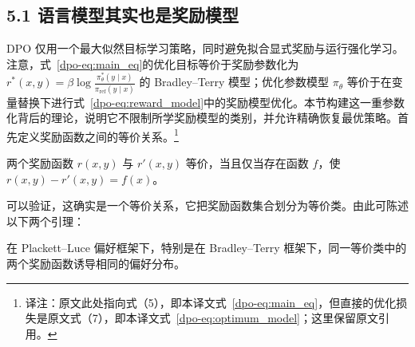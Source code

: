 \label{dpo-sec:theory}

\subsection*{5.1 语言模型其实也是奖励模型}
DPO 仅用一个最大似然目标学习策略，同时避免拟合显式奖励与运行强化学习。注意，式~\ref{dpo-eq:main_eq}的优化目标等价于奖励参数化为 $r^*(x,y)=\beta\log\frac{\pi^*_\theta(y\mid x)}{\pi_{\mathrm{ref}}(y\mid x)}$ 的 Bradley--Terry 模型；优化参数模型 $\pi_\theta$ 等价于在变量替换下进行式~\ref{dpo-eq:reward_model}中的奖励模型优化。本节构建这一重参数化背后的理论，说明它不限制所学奖励模型的类别，并允许精确恢复最优策略。首先定义奖励函数之间的等价关系。\footnote{译注：原文此处指向式（5），即本译文式~\ref{dpo-eq:main_eq}，但直接的优化损失是原文式（7），即本译文式~\ref{dpo-eq:optimum_model}；这里保留原文引用。}

\begin{definition}
两个奖励函数 $r(x,y)$ 与 $r'(x,y)$ 等价，当且仅当存在函数 $f$，使 ${r(x,y)-r'(x,y)=f(x)}$。
\end{definition}
可以验证，这确实是一个等价关系，它把奖励函数集合划分为等价类。由此可陈述以下两个引理：

\begin{lemma}\label{dpo-lemma:same_prefrence}在 Plackett--Luce 偏好框架下，特别是在 Bradley--Terry 框架下，同一等价类中的两个奖励函数诱导相同的偏好分布。
\end{lemma}

